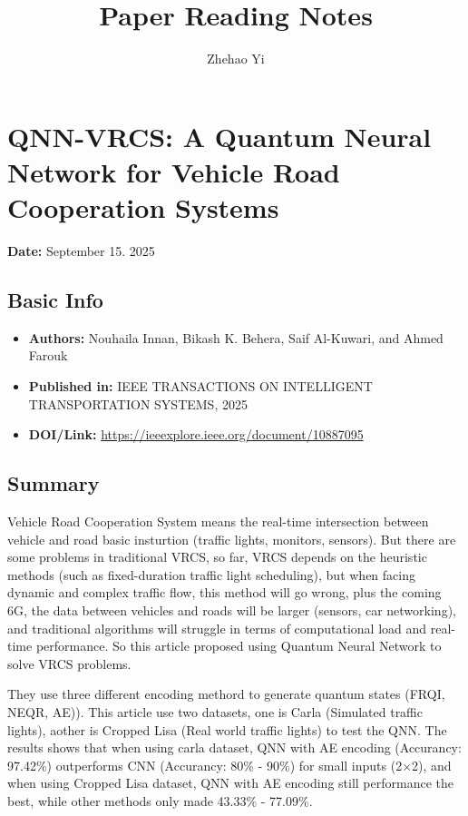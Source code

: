 \documentclass[12pt,a4paper]{article}
\title{Paper Reading Notes}
\author{Zhehao Yi}
\date{}
\begin{document}
\maketitle
\tableofcontents
\newpage


\section{QNN-VRCS: A Quantum Neural Network for
Vehicle Road Cooperation Systems}
\textbf{Date:} September 15. 2025

\subsection*{Basic Info}
\begin{itemize}
    \item \textbf{Authors:} Nouhaila Innan, Bikash K. Behera, Saif Al-Kuwari, and Ahmed Farouk
    \item \textbf{Published in:} IEEE TRANSACTIONS ON INTELLIGENT TRANSPORTATION SYSTEMS, 2025
    \item \textbf{DOI/Link:} \url{https://ieeexplore.ieee.org/document/10887095}
\end{itemize}

\subsection*{Summary}
Vehicle Road Cooperation System means the real-time intersection between vehicle and road basic insturtion (traffic lights, monitors, sensors). But there are some problems in traditional VRCS, so far, VRCS depends on the heuristic methods (such as fixed-duration traffic light scheduling), but when facing dynamic and complex traffic flow, this method will go wrong, plus the coming 6G, the data between vehicles and roads will be larger (sensors, car networking), and traditional algorithms will struggle in terms of computational load and real-time performance. So this article proposed using Quantum Neural Network to solve VRCS problems.

They use three different encoding methord to generate quantum states (FRQI, NEQR, AE)). This article use two datasets, one is Carla (Simulated traffic lights), aother is Cropped Lisa (Real world traffic lights) to test the QNN. The results shows that when using carla dataset, QNN with AE encoding (Accurancy: 97.42\%) outperforms CNN (Accurancy: 80\% - 90\%) for small inputs (2$\times$2), and when using Cropped Lisa dataset, QNN with AE encoding still performance the best, while other methods only made 43.33\% - 77.09\%.
\end{document}
